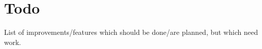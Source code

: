 \chapter{Todo}
List of improvements/features which should be done/are planned, but
which need work.
